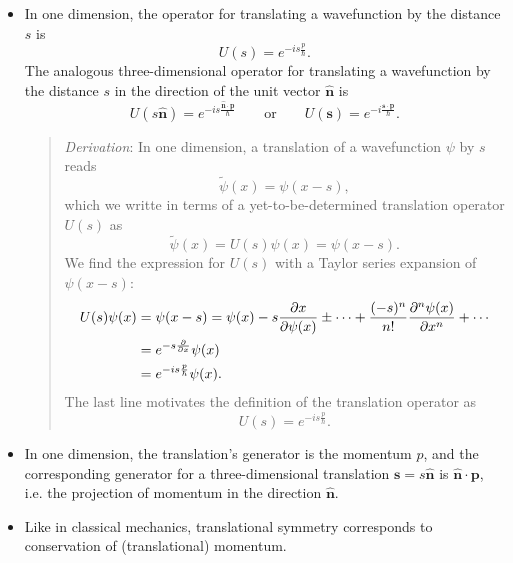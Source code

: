 \documentclass[11pt, a4paper]{article}
\newcommand{\eqtext}[1]{\qquad \text{#1} \qquad}
\renewcommand{\vec}[1]{\bm{#1}}  %
\newcommand{\uvec}[1]{\hat{\vec{#1}}}  %
\newcommand{\p}{\psi}  %
\begin{document}
\begin{itemize}
    \item In one dimension, the operator for translating a wavefunction by the distance $ s $ is
    \begin{equation*}
        U(s) = e^{-is \frac{p}{\hbar}}.
    \end{equation*}
    The analogous three-dimensional operator for translating a wavefunction by the distance $ s $ in the direction of the unit vector $ \uvec{n} $ is
    \begin{equation*}
		U(s \uvec{n}) = e^{-is \frac{\uvec{n}\cdot \vec{p}}{\hbar}} \eqtext{or} U(\vec{s}) = e^{-i \frac{\vec{s}\cdot \vec{p}}{\hbar}}.
    \end{equation*}
    \begin{quote}
        \textit{Derivation}: In one dimension, a translation of a wavefunction $ \p $ by $ s $ reads
        \begin{equation*}
            \tilde{\p}(x) = \p(x - s),
        \end{equation*}
        which we writte in terms of a yet-to-be-determined translation operator $ U(s) $ as
        \begin{equation*}
            \tilde{\psi}(x) = U(s)\p(x) = \p(x - s).
        \end{equation*}
        We find the expression for $ U(s) $ with a Taylor series expansion of $ \p(x - s) $:
        \begin{align*}
            U(s)\p(x) &= \p(x - s) = \p(x) - s \pdv{x}{\p(x)} \pm  \cdots + \frac{(-s)^{n}}{n!}\pdv[n]{\p(x)}{x} + \cdots \\
            & = e^{-s \pdv{x}}\p(x) \\
            & = e^{-is\frac{p}{\hbar}}\p(x).
        \end{align*}
        The last line motivates the definition of the translation operator as
        \begin{equation*}
            U(s) = e^{-is\frac{p}{\hbar}}.
        \end{equation*}
    \end{quote}
    
	
    \item In one dimension, the translation's generator is the momentum $ p $, and the corresponding generator for a three-dimensional translation $ \vec{s} = s \uvec{n} $ is $ \uvec{n} \cdot \vec{p} $, i.e. the projection of momentum in the direction $ \uvec{n} $.
	
	\item Like in classical mechanics, translational symmetry corresponds to conservation of (translational) momentum. 
	

\end{itemize}
\end{document}
